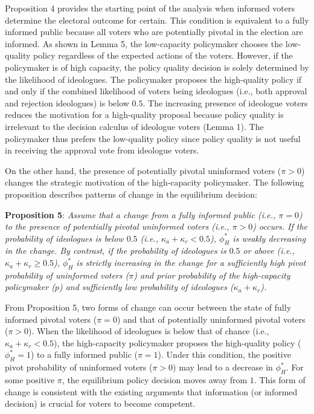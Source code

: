 \documentclass[doc,natbib,12pt]{apa6}
\begin{document}
	\noindent Proposition 4 provides the starting point of the analysis when informed voters determine the electoral outcome for certain. This condition is equivalent to a fully informed public because all voters who are potentially pivotal in the election are informed. As shown in Lemma 5, the low-capacity policymaker chooses the low-quality policy regardless of the expected actions of the voters. However, if the policymaker is of high capacity, the policy quality decision is solely determined by the likelihood of ideologues. The policymaker proposes the high-quality policy if and only if the combined likelihood of voters being ideologues (i.e., both approval and rejection ideologues) is below $0.5$. The increasing presence of ideologue voters reduces the motivation for a high-quality proposal because policy quality is irrelevant to the decision calculus of ideologue voters (Lemma 1). The policymaker thus prefers the low-quality policy since policy quality is not useful in receiving the approval vote from ideologue voters.
	
	\par On the other hand, the presence of potentially pivotal uninformed voters ($\pi>0$) changes the strategic motivation of the high-capacity policymaker. The following proposition describes patterns of change in the equilibrium decision:
	
	\noindent \textbf{Proposition 5}: \textit{Assume that a change from a fully informed public (i.e., $\pi=0$) to the presence of potentially pivotal uninformed voters (i.e., $\pi>0$) occurs. If the probability of ideologues is below $0.5$ (i.e., $\kappa_{a} + \kappa_{r} < 0.5$), $\phi^*_H$ is weakly decreasing in the change. By contrast, if the probability of ideologues is $0.5$ or above (i.e., $\kappa_{a} + \kappa_{r} \geq 0.5$), $\phi^*_H$ is strictly increasing in the change for a sufficiently high pivot probability of uninformed voters ($\pi$) and prior probability of the high-capacity policymaker ($p$) and sufficiently low probability of ideologues ($\kappa_{a}+\kappa_{r}$).}
	
	\noindent From Proposition 5, two forms of change can occur between the state of fully informed pivotal voters ($\pi=0$) and that of potentially uninformed pivotal voters ($\pi>0$). When the likelihood of ideologues is below that of chance (i.e., $\kappa_{a} + \kappa_{r} < 0.5$), the high-capacity policymaker proposes the high-quality policy ($\phi^*_H=1$) to a fully informed public ($\pi=1$). Under this condition, the positive pivot probability of uninformed voters ($\pi > 0$) may lead to a decrease in $\phi^*_H$. For some positive $\pi$, the equilibrium policy decision moves away from $1$. This form of change is consistent with the existing arguments that information (or informed decision) is crucial for voters to become competent. 
	
\end{document}
